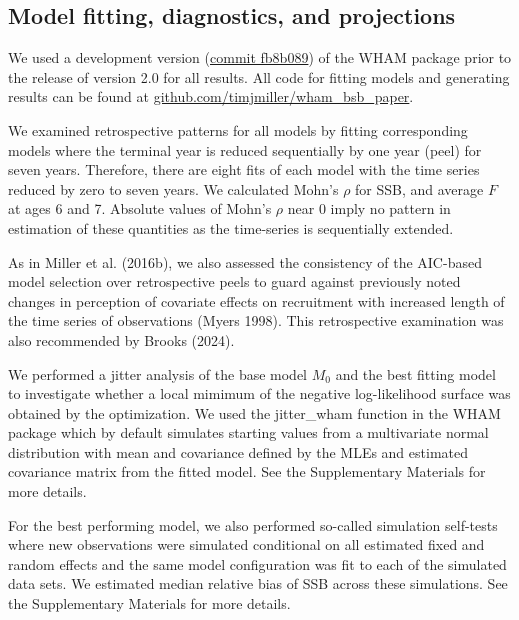 \documentclass[
]{article}
\begin{document}
\hypertarget{model-fitting-diagnostics-and-projections}{%
\subsection*{Model fitting, diagnostics, and
projections}\label{model-fitting-diagnostics-and-projections}}

We used a development version
(\href{https://github.com/timjmiller/wham/tree/fb8b089}{commit fb8b089})
of the WHAM package prior to the release of version 2.0 for all results.
All code for fitting models and generating results can be found at
\href{https://github.com/timjmiller/wham_bsb_paper}{github.com/timjmiller/wham\_bsb\_paper}.

We examined retrospective patterns for all models by fitting
corresponding models where the terminal year is reduced sequentially by
one year (peel) for seven years. Therefore, there are eight fits of each
model with the time series reduced by zero to seven years. We calculated
Mohn's \(\rho\) for SSB, and average \(F\) at ages 6 and 7. Absolute
values of Mohn's \(\rho\) near 0 imply no pattern in estimation of these
quantities as the time-series is sequentially extended.

As in Miller et al. (2016b), we also assessed the consistency of the
AIC-based model selection over retrospective peels to guard against
previously noted changes in perception of covariate effects on
recruitment with increased length of the time series of observations
(Myers 1998). This retrospective examination was also recommended by
Brooks (2024).

We performed a jitter analysis of the base model \(M_0\) and the best
fitting model to investigate whether a local mimimum of the negative
log-likelihood surface was obtained by the optimization. We used the
jitter\_wham function in the WHAM package which by default simulates
starting values from a multivariate normal distribution with mean and
covariance defined by the MLEs and estimated covariance matrix from the
fitted model. See the Supplementary Materials for more details.

For the best performing model, we also performed so-called simulation
self-tests where new observations were simulated conditional on all
estimated fixed and random effects and the same model configuration was
fit to each of the simulated data sets. We estimated median relative
bias of SSB across these simulations. See the Supplementary Materials
for more details.
\end{document}
